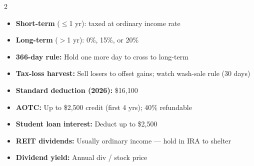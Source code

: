 \documentclass[11pt, letterpaper]{article}
\begin{document}
\vspace{4pt}

\begin{tcolorbox}[colback=part5bg, colframe=sectionteal,
  title={\bfseries Taxation Strategy}, arc=3pt, boxrule=1pt]
\footnotesize
\begin{multicols}{2}
\begin{itemize}[noitemsep, leftmargin=*]
  \item \textbf{Short-term} ($\leq$1 yr): taxed at ordinary income rate
  \item \textbf{Long-term} ($>$1 yr): 0\%, 15\%, or 20\%
  \item \textbf{366-day rule:} Hold one more day to cross to long-term
  \item \textbf{Tax-loss harvest:} Sell losers to offset gains; watch wash-sale rule (30 days)
\end{itemize}
\columnbreak
\begin{itemize}[noitemsep, leftmargin=*]
  \item \textbf{Standard deduction (2026):} \$16{,}100
  \item \textbf{AOTC:} Up to \$2{,}500 credit (first 4 yrs); 40\% refundable
  \item \textbf{Student loan interest:} Deduct up to \$2{,}500
  \item \textbf{REIT dividends:} Usually ordinary income --- hold in IRA to shelter
  \item \textbf{Dividend yield:} Annual div / stock price
\end{itemize}
\end{multicols}
\end{tcolorbox}

\vspace{4pt}
\end{document}
